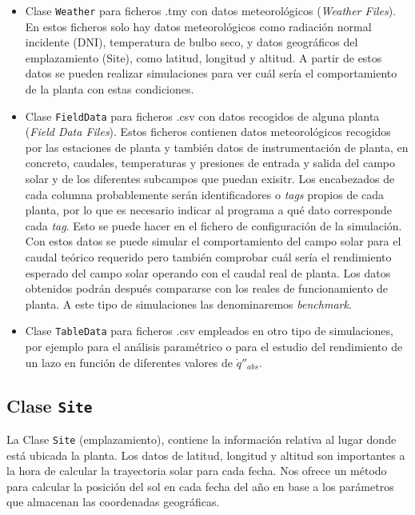 \begin{itemize}
\item
  Clase \texttt{Weather} para ficheros .tmy con datos meteorológicos (\emph{Weather  Files}). En estos ficheros solo hay datos meteorológicos como radiación   normal incidente (DNI), temperatura de bulbo seco, y datos  geográficos del emplazamiento (Site), como latitud, longitud y   altitud. A partir de estos datos se pueden realizar simulaciones para  ver cuál sería el comportamiento de la planta con estas condiciones.
\item
  Clase \texttt{FieldData} para ficheros .csv con datos recogidos de alguna planta (\emph{Field Data Files}). Estos ficheros contienen datos   meteorológicos recogidos por las estaciones de planta y también datos de instrumentación de planta, en concreto, caudales,  temperaturas y presiones de   entrada y salida del campo solar y de los diferentes subcampos que puedan exisitr.  Los encabezados de cada columna  probablemente serán identificadores o \emph{tags} propios de cada planta, por  lo que es necesario indicar al programa a qué dato corresponde cada \emph{tag}. Esto se puede hacer en el fichero de configuración de la  simulación. Con estos datos se puede simular el comportamiento del   campo solar para el caudal teórico requerido pero también comprobar cuál  sería el rendimiento esperado del campo solar operando con el caudal real de planta. Los datos obtenidos podrán después compararse con los reales   de funcionamiento de planta. A este tipo de simulaciones las   denominaremos \emph{benchmark}.
\item
  Clase \texttt{TableData} para ficheros .csv empleados en otro tipo de simulaciones, por ejemplo para el análisis paramétrico o para el estudio del rendimiento de un lazo en  función de diferentes valores de \(\dot q''_{abs}\).
\end{itemize}

\subsection{Clase \texttt{Site}}

La Clase \texttt{Site} (emplazamiento), contiene la información relativa al lugar donde está ubicada la planta. Los datos de latitud, longitud y altitud son importantes a la hora de calcular la trayectoria solar para cada fecha. Nos ofrece un método para calcular la posición del sol en cada fecha del año en base a los parámetros que almacenan las coordenadas geográficas. 

